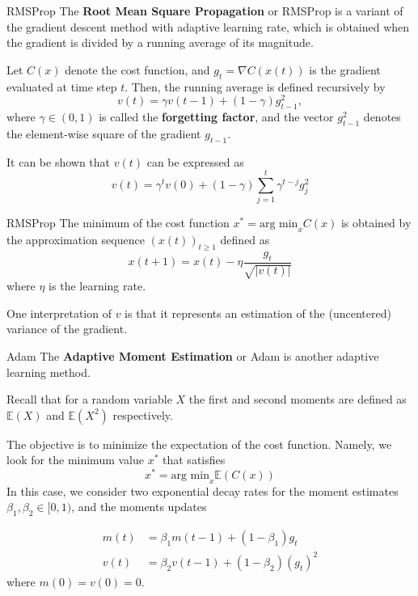\documentclass{beamer}
\begin{document}
\begin{frame}{RMSProp}
	 The \textbf{Root Mean Square Propagation} or RMSProp is a variant of the gradient descent method with adaptive learning rate, which is obtained when the gradient is divided by a running average of its magnitude.
	 
	 Let $C(x)$ denote the cost function, and $g_t= \nabla C(x(t))$ is the gradient evaluated at time step $t$. Then, the running average is defined recursively by
	 \begin{equation*}
	 	v(t)=\gamma v(t-1)+(1-\gamma)g_{t-1}^2,
	 \end{equation*}
	 where $\gamma\in (0,1)$ is called the \textbf{forgetting factor}, and the vector $g_{t-1}^2$ denotes the element-wise square of the gradient $g_{t-1}$. 
	 
	 It can be shown that  $v(t)$ can be expressed as
	 \begin{equation*}
	 	v(t)= \gamma^t v(0)+ (1-\gamma) \sum_{j=1}^t \gamma^{t-j}g_j^2
	 \end{equation*}
	 
\end{frame}
\begin{frame}{RMSProp}
	The minimum of the cost function $x^* = \text{arg min}_x C(x)$ is obtained by the approximation sequence $(x(t))_{t\ge 1}$ defined as
	\begin{equation*}
		x(t+1)= x(t)- \eta \frac{g_t}{\sqrt{|v(t)|}}
	\end{equation*}
where $\eta$ is the learning rate. 

One interpretation of $v$ is that it represents an estimation of the (uncentered) variance of the gradient. 
\end{frame}

\begin{frame}{Adam}
	The \textbf{Adaptive Moment Estimation} or Adam is another adaptive learning method. 
	
	\begin{fact}
		Recall that for a random variable $X$ the first and second moments are defined as $\mathbb{E}(X)$ and $\mathbb{E}(X^2)$ respectively.
	\end{fact}
	
	
	The objective is to minimize the expectation of the cost function. Namely, we look for the minimum value $x^*$ that satisfies 
	\begin{equation*}
		x^*= \text{arg min}_x \mathbb{E}(C(x))
	\end{equation*}
	In this case, we consider two exponential decay rates for the moment estimates $\beta_1,\beta_2 \in [0,1)$, and the moments updates
	
	\begin{equation*}
		\begin{split}
			m(t)&= \beta_1 m(t-1) + (1-\beta_1)g_t \\
			v(t)&=\beta_2 v(t-1)+ (1-\beta_2)(g_t)^2
		\end{split}
	\end{equation*} 	
where $m(0)=v(0)=0$.  
\end{frame}
\end{document}
